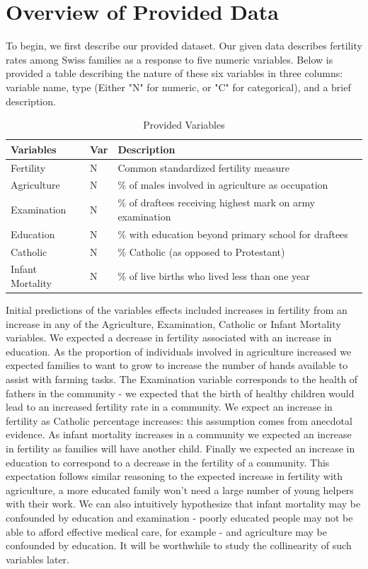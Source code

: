 \documentclass[preprint,12pt]{elsarticle}
\begin{document}

\section*{Overview of Provided Data}
\label{S:1}

\noindent To begin, we first describe our provided dataset. Our given data describes fertility rates among Swiss families as a response to five numeric variables. Below is provided a table describing the nature of these six variables in three columns: variable name, type (Either "N" for numeric, or "C" for categorical), and a brief description.

\begin{table}[h]
\centering
\begin{tabular}{l l l}
\hline
\textbf{Variables} & \textbf{Var} & \textbf{Description}\\
\hline
Fertility & N & Common standardized fertility measure \\
Agriculture & N & \% of males involved in agriculture as occupation \\
Examination & N & \% of draftees receiving highest mark on army examination \\
Education & N & \% with education beyond primary school for draftees \\
Catholic & N & \% Catholic (as opposed to Protestant) \\
Infant Mortality & N & \% of live births who lived less than one year \\
\hline
\end{tabular}
\caption{Provided Variables}
\end{table}

\noindent Initial predictions of the variables effects included increases in fertility from an increase in any of the Agriculture, Examination, Catholic or Infant Mortality variables. We expected a decrease in fertility associated with an increase in education. As the proportion of individuals involved in agriculture increased we expected families to want to grow to increase the number of hands available to assist with farming tasks. The Examination variable corresponds to the health of fathers in the community - we expected that the birth of healthy children would lead to an increased fertility rate in a community. We expect an increase in fertility as Catholic percentage increases: this assumption comes from anecdotal evidence. As infant mortality increases in a community we expected an increase in fertility as families will have another child. Finally we expected an increase in education to correspond to a decrease in the fertility of a community. This expectation follows similar reasoning to the expected increase in fertility with agriculture, a more educated family won't need a large number of young helpers with their work. We can also intuitively hypothesize that infant mortality may be confounded by education and examination - poorly educated people may not be able to afford effective medical care, for example - and agriculture may be confounded by education. It will be worthwhile to study the collinearity of such variables later. \\
\end{document}

